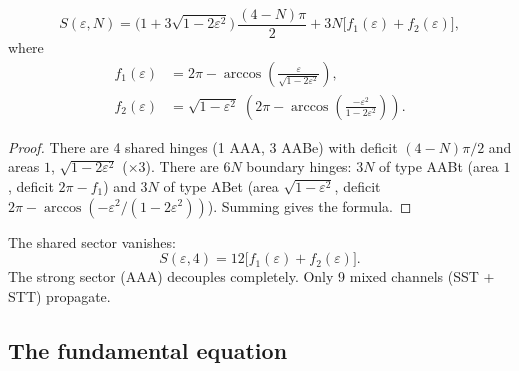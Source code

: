 \begin{theorem}
\label{thm:closed_action}
\begin{equation}
\boxed{S(\varepsilon,N) = \bigl(1 + 3\sqrt{1-2\varepsilon^2}\bigr)\,\frac{(4-N)\pi}{2} + 3N\bigl[f_1(\varepsilon) + f_2(\varepsilon)\bigr],}
\end{equation}
where
\begin{align}
f_1(\varepsilon) &= 2\pi - \arccos\!\left(\frac{\varepsilon}{\sqrt{1-2\varepsilon^2}}\right), \\[4pt]
f_2(\varepsilon) &= \sqrt{1-\varepsilon^2}\;\left(2\pi - \arccos\!\left(\frac{-\varepsilon^2}{1-2\varepsilon^2}\right)\right).
\end{align}
\end{theorem}
\begin{proof}
There are 4 shared hinges (1 AAA, 3 AABe) with deficit $(4\!-\!N)\pi/2$ and areas $1$, $\sqrt{1\!-\!2\varepsilon^2}$ ($\times 3$).  There are $6N$ boundary hinges: $3N$ of type AABt (area $1$, deficit $2\pi\!-\!f_1$) and $3N$ of type ABet (area $\sqrt{1\!-\!\varepsilon^2}$, deficit $2\pi\!-\!\arccos(-\varepsilon^2/(1\!-\!2\varepsilon^2))$).  Summing gives the formula.
\end{proof}

\begin{corollary}[Flat manifold $N=4$]
\label{cor:flat_action}
The shared sector vanishes:
\begin{equation}
S(\varepsilon, 4) = 12\bigl[f_1(\varepsilon) + f_2(\varepsilon)\bigr].
\end{equation}
The strong sector (AAA) decouples completely.  Only 9 mixed channels (SST + STT) propagate.
\end{corollary}

\subsection{The fundamental equation}
\label{sec:fundamental_eq}

